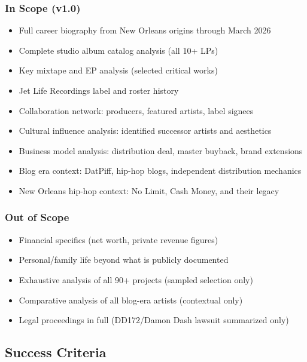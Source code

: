\documentclass[11pt,letterpaper]{article}
\begin{document}
\subsubsection{In Scope (v1.0)}
\begin{itemize}[leftmargin=1.5em]
  \item Full career biography from New Orleans origins through March 2026
  \item Complete studio album catalog analysis (all 10+ LPs)
  \item Key mixtape and EP analysis (selected critical works)
  \item Jet Life Recordings label and roster history
  \item Collaboration network: producers, featured artists, label signees
  \item Cultural influence analysis: identified successor artists and aesthetics
  \item Business model analysis: distribution deal, master buyback, brand extensions
  \item Blog era context: DatPiff, hip-hop blogs, independent distribution mechanics
  \item New Orleans hip-hop context: No Limit, Cash Money, and their legacy
\end{itemize}

\subsubsection{Out of Scope}
\begin{itemize}[leftmargin=1.5em]
  \item Financial specifics (net worth, private revenue figures)
  \item Personal/family life beyond what is publicly documented
  \item Exhaustive analysis of all 90+ projects (sampled selection only)
  \item Comparative analysis of all blog-era artists (contextual only)
  \item Legal proceedings in full (DD172/Damon Dash lawsuit summarized only)
\end{itemize}

\subsection{Success Criteria}
\end{document}
